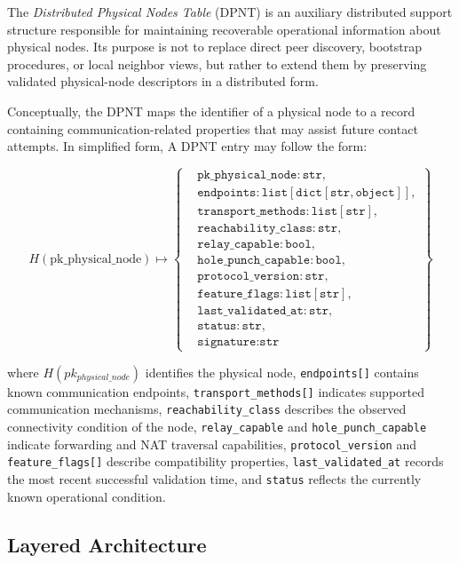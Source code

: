 \documentclass[12pt,a4paper]{article}
\begin{document}
The \textit{Distributed Physical Nodes Table} (DPNT) is an auxiliary distributed support structure responsible for maintaining recoverable operational information about physical nodes. Its purpose is not to replace direct peer discovery, bootstrap procedures, or local neighbor views, but rather to extend them by preserving validated physical-node descriptors in a distributed form.

Conceptually, the DPNT maps the identifier of a physical node to a record containing communication-related properties that may assist future contact attempts. In simplified form, A DPNT entry may follow the form:

\[
H(\mathrm{pk\_physical\_node}) \mapsto
\left\{
\begin{aligned}
&\texttt{pk\_physical\_node}: \texttt{str},\\
&\texttt{endpoints}: \texttt{list}[\texttt{dict}[\texttt{str}, \texttt{object}]],\\
&\texttt{transport\_methods}: \texttt{list}[\texttt{str}],\\
&\texttt{reachability\_class}: \texttt{str},\\
&\texttt{relay\_capable}: \texttt{bool},\\
&\texttt{hole\_punch\_capable}: \texttt{bool},\\
&\texttt{protocol\_version}: \texttt{str},\\
&\texttt{feature\_flags}: \texttt{list}[\texttt{str}],\\
&\texttt{last\_validated\_at}: \texttt{str},\\
&\texttt{status}: \texttt{str},\\
&\texttt{signature}: \texttt{str}
\end{aligned}
\right\}
\]

where \(H(pk_{physical\_node})\) identifies the physical node, \texttt{endpoints[]} contains known communication endpoints, \texttt{transport\_methods[]} indicates supported communication mechanisms, \texttt{reachability\_class} describes the observed connectivity condition of the node, \texttt{relay\_capable} and \texttt{hole\_punch\_capable} indicate forwarding and NAT traversal capabilities, \texttt{protocol\_version} and \texttt{feature\_flags[]} describe compatibility properties, \texttt{last\_validated\_at} records the most recent successful validation time, and \texttt{status} reflects the currently known operational condition.



\subsection{Layered Architecture}
\end{document}
